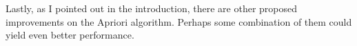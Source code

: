 \documentclass[12 pt]{article}
\begin{document}
Lastly, as I pointed out in the introduction, there are other proposed improvements on the Apriori algorithm. Perhaps some combination of them could yield even better performance.

\pagebreak

{}
\end{document}
